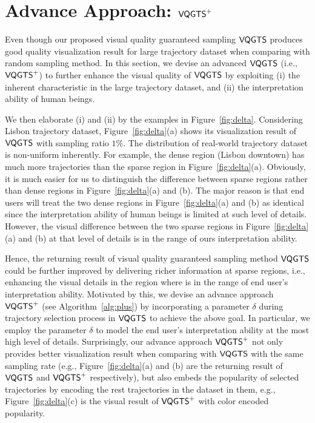 \section{Advance Approach: $\mathsf{VQGTS}^{+}$}


Even though our proposed visual quality guaranteed sampling $\mathsf{VQGTS}$ produces good quality visualization result for large trajectory dataset when comparing with random sampling method.
In this section, we devise an advanced $\mathsf{VQGTS}$ (i.e., $\mathsf{VQGTS}^{+}$) to further enhance the visual quality of $\mathsf{VQGTS}$ by exploiting
(i) the inherent characteristic in the large trajectory dataset, and (ii) the interpretation ability of human beings.

We then elaborate (i) and (ii) by the examples in Figure~\ref{fig:delta}.
Considering Lisbon trajectory dataset, Figure~\ref{fig:delta}(a) shows its visualization result of $\mathsf{VQGTS}$ with sampling ratio $1\%$.
The distribution of real-world trajectory dataset is non-uniform inherently.
For example, the dense region (Lisbon downtown) has much more trajectories than the sparse region in Figure~\ref{fig:delta}(a).
Obviously, it is much easier for us to distinguish the difference between sparse regions rather than dense regions in Figure~\ref{fig:delta}(a) and (b).
The major reason is that end users will treat the two dense regions in Figure~\ref{fig:delta}(a) and (b) as identical
since the interpretation ability of human beings is limited at such level of details.
However, the visual difference between the two sparse regions in Figure~\ref{fig:delta}(a) and (b) at that level of details is in the range of ours interpretation ability.

Hence, the returning result of visual quality guaranteed sampling method $\mathsf{VQGTS}$ could be further improved by delivering richer information at sparse regions,
i.e., enhancing the visual details in the region where is in the range of end user's interpretation ability.
Motivated by this, we devise an advance approach $\mathsf{VQGTS}^{+}$ (see Algorithm~\ref{alg:plus}) by incorporating a parameter $\delta$ during trajectory selection process in $\mathsf{VQGTS}$ to achieve the above goal.
In particular, we employ the parameter $\delta$ to model the end user's interpretation ability at the most high level of details.
Surprisingly, our advance approach $\mathsf{VQGTS}^{+}$ not only provides better visualization result when comparing with $\mathsf{VQGTS}$ with the same sampling rate
(e.g., Figure~\ref{fig:delta}(a) and (b) are the returning result of $\mathsf{VQGTS}$ and $\mathsf{VQGTS}^{+}$ respectively),
but also embeds the popularity of selected trajectories by encoding the rest trajectories in the dataset in them,
e.g., Figure~\ref{fig:delta}(c) is the visual result of $\mathsf{VQGTS}^{+}$ with color encoded popularity.


